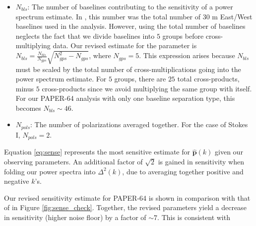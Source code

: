 \documentclass[preprint2,numberedappendix,tighten]{aastex6}  %
\begin{document}
\begin{itemize}
\item $N_{bls}$: The number of baselines contributing to the sensitivity of a power spectrum estimate. In \citet{ali_et_al2015}, this number was the total number of $30$ m East/West baselines used in the analysis. However, using the total number of baselines neglects the fact that we divide baselines into $5$ groups before cross-multiplying data. Our revised estimate for the parameter is $N_{bls} = \frac{N_{bls}}{N_{gps}}\sqrt{N_{gps}^{2}-N_{gps}}$, where $N_{gps} = 5$. This expression arises because $N_{bls}$ must be scaled by the total number of cross-multiplications going into the power spectrum estimate. For $5$ groups, there are $25$ total cross-products, minus $5$ cross-products since we avoid multiplying the same group with itself. For our PAPER-64 analysis with only one baseline separation type, this becomes $N_{bls} \sim 46$. 
\item $N_{pols}$: The number of polarizations averaged together. For the case of Stokes I, $N_{pols}=2$.
\end{itemize}

Equation \eqref{eq:sense} represents the most sensitive estimate for $\hat{\textbf{p}}(k)$ given our observing parameters. An additional factor of $\sqrt{2}$ is gained in sensitivity when folding our power spectra into $\Delta^{2}(k)$, due to averaging together positive and negative $k$'s. 

Our revised sensitivity estimate for PAPER-64 is shown in comparison with that of \citet{ali_et_al2015} in Figure \ref{fig:sense_check}. Together, the revised parameters yield a decrease in sensitivity (higher noise floor) by a factor of $\sim7$. This is consistent with 
\end{document}
